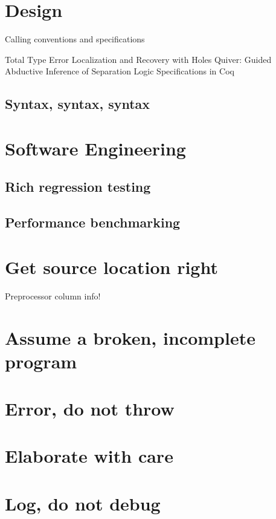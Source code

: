 \section{Design}

Calling conventions and specifications

Total Type Error Localization and Recovery with Holes
Quiver: Guided Abductive Inference of Separation Logic
Specifications in Coq

\subsection{Syntax, syntax, syntax}

\section{Software Engineering}

\subsection{Rich regression testing}

\subsection{Performance benchmarking}

\section{Get source location right}

Preprocessor column info!

\section{Assume a broken, incomplete program}

\section{Error, do not throw}

\section{Elaborate with care}

\section{Log, do not debug}

